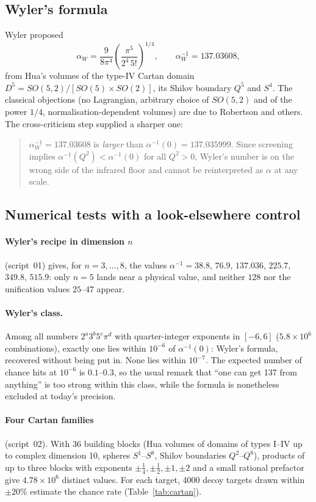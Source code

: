\documentclass[11pt,a4paper]{article}
\newcommand{\ainv}{\alpha^{-1}}
\begin{document}
\subsection{Wyler's formula}
Wyler \cite{Wyler} proposed
\begin{equation}
\alpha_W=\frac{9}{8\pi^4}\left(\frac{\pi^5}{2^4\,5!}\right)^{1/4},\qquad \ainv_W=137.03608,
\end{equation}
from Hua's volumes \cite{Hua} of the type-IV Cartan domain $D^5=SO(5,2)/[SO(5)\times SO(2)]$, its Shilov boundary $Q^5$ and
$S^4$. The classical objections (no Lagrangian, arbitrary choice of $SO(5,2)$ and of the power $1/4$, normalisation-dependent
volumes) are due to Robertson \cite{Robertson} and others. The cross-criticism step supplied a sharper one:
\begin{quote}
$\ainv_W=137.03608$ is \emph{larger} than $\ainv(0)=137.035999$. Since screening implies $\ainv(Q^2)<\ainv(0)$ for all
$Q^2>0$, Wyler's number is on the wrong side of the infrared floor and cannot be reinterpreted as $\alpha$ at any scale.
\end{quote}

\subsection{Numerical tests with a look-elsewhere control}
\paragraph{Wyler's recipe in dimension $n$} (script~01) gives, for $n=3,\dots,8$, the values $\ainv=38.8$, $76.9$, $\mathbf{137.036}$, $225.7$, $349.8$, $515.9$: only $n=5$ lands near a physical value, and neither $128$ nor the unification values $25$--$47$ appear.

\paragraph{Wyler's class.} Among all numbers $2^a3^b5^c\pi^d$ with quarter-integer exponents in $[-6,6]$
($5.8\times10^6$ combinations), exactly one lies within $10^{-6}$ of $\ainv(0)$: Wyler's formula, recovered without being
put in. None lies within $10^{-7}$. The expected number of chance hits at $10^{-6}$ is $0.1$--$0.3$, so the usual
remark that ``one can get 137 from anything'' is too strong within this class, while the formula is nonetheless excluded
at today's precision.

\paragraph{Four Cartan families} (script~02). With 36 building blocks (Hua volumes of domains of types I--IV up to complex
dimension 10, spheres $S^1$--$S^8$, Shilov boundaries $Q^2$--$Q^8$), products of up to three blocks with exponents
$\pm\frac14,\pm\frac12,\pm1,\pm2$ and a small rational prefactor give $4.78\times10^6$ distinct values. For each target,
4000 decoy targets drawn within $\pm20\%$ estimate the chance rate (Table~\ref{tab:cartan}).
\end{document}
